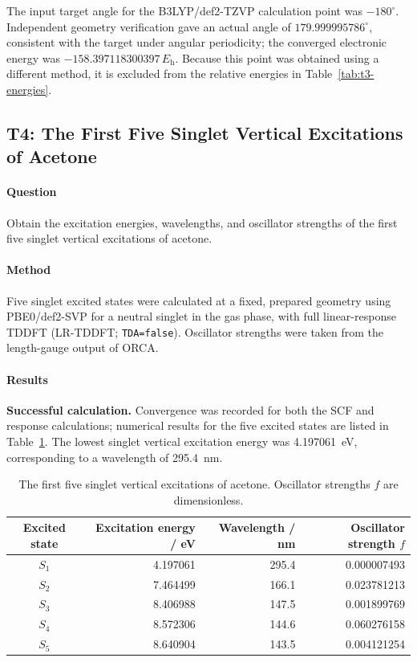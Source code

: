 \documentclass[a4paper,11pt]{article}
\newcommand{\Eh}{E_{\mathrm h}}
\newcommand{\code}[1]{\texttt{#1}}
\begin{document}
The input target angle for the B3LYP/def2-TZVP calculation point was $-180^\circ$.
Independent geometry verification gave an actual angle of $179.999995786^\circ$, consistent with the target under angular periodicity;
the converged electronic energy was $-158.397118300397\,\Eh$.
Because this point was obtained using a different method, it is excluded from the relative energies in Table~\ref{tab:t3-energies}.

\subsection{T4: The First Five Singlet Vertical Excitations of Acetone}
\paragraph{Question}
Obtain the excitation energies, wavelengths, and oscillator strengths of the first five singlet vertical excitations of acetone.

\paragraph{Method}
Five singlet excited states were calculated at a fixed, prepared geometry using PBE0/def2-SVP for a neutral singlet in the gas phase,
with full linear-response TDDFT (LR-TDDFT; \code{TDA=false}).
Oscillator strengths were taken from the length-gauge output of ORCA.

\paragraph{Results}
\textbf{Successful calculation.} Convergence was recorded for both the SCF and response calculations; numerical results for the five excited states are listed in Table~\ref{tab:t4-excitations}.
The lowest singlet vertical excitation energy was 4.197061~eV, corresponding to a wavelength of 295.4~nm.

\begin{table}[H]
  \centering\small
  \caption{The first five singlet vertical excitations of acetone.
  Oscillator strengths $f$ are dimensionless.
  }
  \label{tab:t4-excitations}
  \begin{tabular}{crrr}
    \toprule
    Excited state & Excitation energy / eV & Wavelength / nm & Oscillator strength $f$\\
    \midrule
    $S_{1}$ & 4.197061 & 295.4 & 0.000007493\\
    $S_{2}$ & 7.464499 & 166.1 & 0.023781213\\
    $S_{3}$ & 8.406988 & 147.5 & 0.001899769\\
    $S_{4}$ & 8.572306 & 144.6 & 0.060276158\\
    $S_{5}$ & 8.640904 & 143.5 & 0.004121254\\
    \bottomrule
  \end{tabular}
\end{table}
\end{document}
